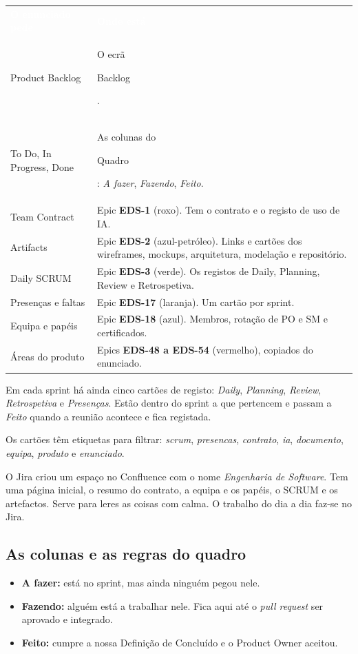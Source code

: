 \documentclass[11pt,a4paper]{article}
\newcommand{\th}[1]{\textcolor{white}{\sffamily\bfseries #1}}
\newcommand{\btn}[1]{{\setlength{\fboxsep}{1.6pt}\colorbox{azulclaro}{\sffamily\small\strut #1}}}
\newcommand{\tabelaini}{\begingroup\small\renewcommand{\arraystretch}{1.45}\rowcolors{2}{azulclaro!55}{white}}
\newcommand{\tabelafim}{\endgroup}
\begin{document}
\tabelaini
\begin{tabularx}{\textwidth}{L{3.6cm} Y}
   \th{O enunciado pede} & \th{Onde está} \\
  Product Backlog & O ecrã \btn{Backlog}. \\
  To Do, In Progress, Done & As colunas do \btn{Quadro}: \textit{A fazer}, \textit{Fazendo}, \textit{Feito}. \\
  Team Contract & Epic \textbf{EDS-1} (roxo). Tem o contrato e o registo de uso de IA. \\
  Artifacts & Epic \textbf{EDS-2} (azul-petróleo). Links e cartões dos wireframes, mockups, arquitetura, modelação e repositório. \\
  Daily SCRUM & Epic \textbf{EDS-3} (verde). Os registos de Daily, Planning, Review e Retrospetiva. \\
  Presenças e faltas & Epic \textbf{EDS-17} (laranja). Um cartão por sprint. \\
  Equipa e papéis & Epic \textbf{EDS-18} (azul). Membros, rotação de PO e SM e certificados. \\
  Áreas do produto & Epics \textbf{EDS-48 a EDS-54} (vermelho), copiados do enunciado. \\
  \bottomrule
\end{tabularx}
\tabelafim

Em cada sprint há ainda cinco cartões de registo: \textit{Daily}, \textit{Planning}, \textit{Review}, \textit{Retrospetiva} e \textit{Presenças}. Estão dentro do sprint a que pertencem e passam a \textit{Feito} quando a reunião acontece e fica registada.

Os cartões têm etiquetas para filtrar: \textit{scrum}, \textit{presencas}, \textit{contrato}, \textit{ia}, \textit{documento}, \textit{equipa}, \textit{produto} e \textit{enunciado}.

\begin{tcolorbox}[dica, title={Também há o Confluence}]
  O Jira criou um espaço no Confluence com o nome \textit{Engenharia de Software}. Tem uma página inicial, o resumo do contrato, a equipa e os papéis, o SCRUM e os artefactos. Serve para leres as coisas com calma. O trabalho do dia a dia faz-se no Jira.
\end{tcolorbox}

\subsection{As colunas e as regras do quadro}

\begin{itemize}
  \item \textbf{A fazer:} está no sprint, mas ainda ninguém pegou nele.
  \item \textbf{Fazendo:} alguém está a trabalhar nele. Fica aqui até o \textit{pull request} ser aprovado e integrado.
  \item \textbf{Feito:} cumpre a nossa Definição de Concluído e o Product Owner aceitou.
\end{itemize}
\end{document}
